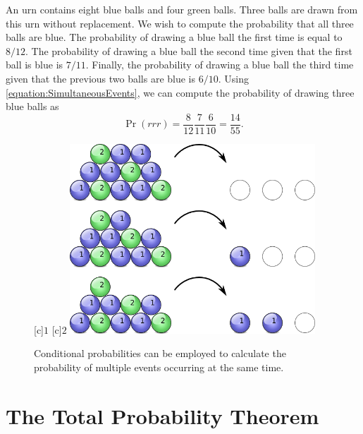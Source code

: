 \begin{example}
An urn contains eight blue balls and four green balls.
Three balls are drawn from this urn without replacement.
We wish to compute the probability that all three balls are blue.
The probability of drawing a blue ball the first time is equal to $8/12$.
The probability of drawing a blue ball the second time given that the first ball is blue is $7/11$.
Finally, the probability of drawing a blue ball the third time given that the previous two balls are blue is $6/10$.
Using \eqref{equation:SimultaneousEvents}, we can compute the probability of drawing three blue balls as
\begin{equation*}
\Pr (rrr)
= \frac{8}{12} \frac{7}{11} \frac{6}{10}
= \frac{14}{55} .
\end{equation*}

\begin{figure}[htb!]
\begin{center}
\begin{psfrags}
[c]{$1$}
[c]{$2$}
\includegraphics[height=7.11cm]{Figures/3Chapter/balls}
\end{psfrags}
\caption{Conditional probabilities can be employed to calculate the probability of multiple events occurring at the same time.}
\label{figure:Balls}
\end{center}
\end{figure}
\end{example}


\section{The Total Probability Theorem}

